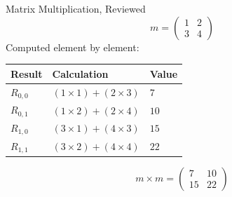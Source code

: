 \documentclass[9pt,aspectratio=169,xcolor=table]{beamer}
\begin{document}
\begin{frame}{Matrix Multiplication, Reviewed}
    \leavevmode
    \[
    m = \begin{pmatrix} 1 & 2 \\ 3 & 4 \end{pmatrix}
    \]
    Computed element by element:

    \begin{center}
    \small
    \begin{tabular}{lll}
        \toprule
        \textbf{Result} & \textbf{Calculation} & \textbf{Value} \\
        \midrule
        $R_{0,0}$ & $(1{\times}1)+(2{\times}3)$ & $7$ \\
        $R_{0,1}$ & $(1{\times}2)+(2{\times}4)$ & $10$ \\
        $R_{1,0}$ & $(3{\times}1)+(4{\times}3)$ & $15$ \\
        $R_{1,1}$ & $(3{\times}2)+(4{\times}4)$ & $22$ \\
        \bottomrule
    \end{tabular}
    \end{center}

    \[
    m \times m = \begin{pmatrix} 7 & 10 \\ 15 & 22 \end{pmatrix}
    \]
\end{frame}
\end{document}

